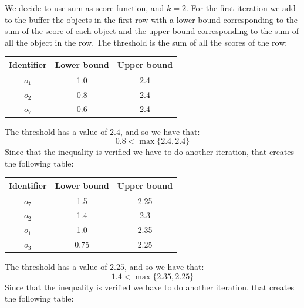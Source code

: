 \begin{example}
\begin{table}[H]
\begin{tabular}{cccccccc}
        \end{tabular}
    \end{table}
    We decide to use sum as score function, and $k=2$. 
    For the first iteration we add to the buffer the  objects in the first row with a lower bound corresponding to the sum of the score of each object and the upper bound corresponding to the sum of all the object in the row. 
    The threshold is the sum of all the scores of the row: 
    \begin{table}[H]
        \centering
        \begin{tabular}{|ccc|}
        \hline
        \textbf{Identifier} & \textbf{Lower bound} & \textbf{Upper bound} \\ \hline
        $o_1$               & 1.0                  & 2.4                  \\ 
        $o_2$               & 0.8                  & 2.4                  \\ 
        $o_7$               & 0.6                  & 2.4                  \\ \hline
        \end{tabular}
    \end{table}
    The threshold has a value of $2.4$, and so we have that:
    \[0.8<\max\{2.4,2.4\}\]
    Since that the inequality is verified we have to do another iteration, that creates the following table: 
    \begin{table}[H]
        \centering
        \begin{tabular}{|ccc|}
        \hline
        \textbf{Identifier} & \textbf{Lower bound} & \textbf{Upper bound} \\ \hline
        $o_7$               & 1.5                  & 2.25                 \\ 
        $o_2$               & 1.4                  & 2.3                  \\ 
        $o_1$               & 1.0                  & 2.35                 \\ 
        $o_3$               & 0.75                 & 2.25                 \\ \hline
        \end{tabular}
    \end{table}
    The threshold has a value of $2.25$, and so we have that:
    \[1.4<\max\{2.35,2.25\}\]
    Since that the inequality is verified we have to do another iteration, that creates the following table: 
    \begin{table}[H]
        \centering
        \begin{tabular}{|ccc|}

\end{tabular}
\end{table}
\end{example}
